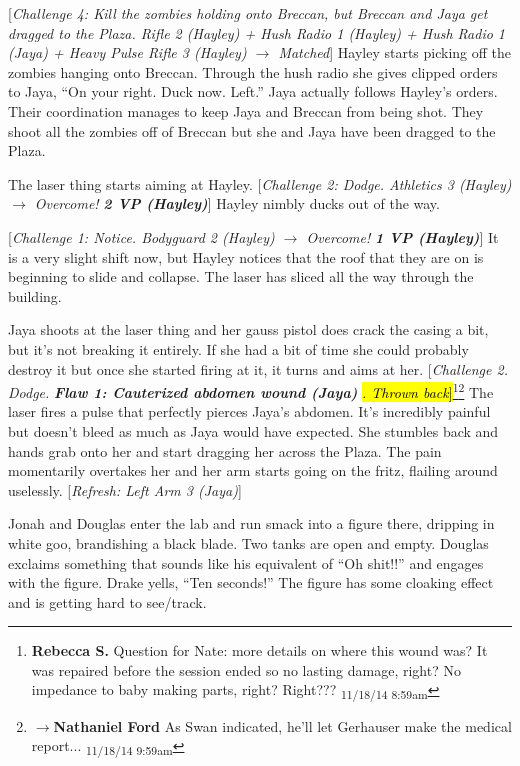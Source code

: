 {[}\textit{Challenge 4: Kill the zombies holding onto Breccan, but Breccan and Jaya get dragged to the Plaza.  Rifle 2 (Hayley) + Hush Radio 1 (Hayley) + Hush Radio 1 (Jaya) + Heavy Pulse Rifle 3 (Hayley) $\rightarrow$ Matched}{]}  Hayley starts picking off the zombies hanging onto Breccan.  Through the hush radio she gives clipped orders to Jaya, ``On your right.  Duck now.  Left.''  Jaya actually follows Hayley's orders.  Their coordination manages to keep Jaya and Breccan from being shot.  They shoot all the zombies off of Breccan but she and Jaya have been dragged to the Plaza.



The laser thing starts aiming at Hayley.  {[}\textit{Challenge 2: Dodge.  Athletics 3 (Hayley) $\rightarrow$  Overcome! }\textit{\textbf{2 VP (Hayley)}}{]}  Hayley nimbly ducks out of the way.  

{[}\textit{Challenge 1: Notice.  Bodyguard 2 (Hayley) $\rightarrow$  Overcome! }\textit{\textbf{1 VP (Hayley)}}{]}  It is a very slight shift now, but Hayley notices that the roof that they are on is beginning to slide and collapse.  The laser has sliced all the way through the building.



Jaya shoots at the laser thing and her gauss pistol does crack the casing a bit, but it's not breaking it entirely.  If she had a bit of time she could probably destroy it but once she started firing at it, it turns and aims at her. {[}\textit{Challenge 2. Dodge.   }\textit{\textbf{ {\color[RGB]{255,0,0}Flaw 1: Cauterized abdomen wound (Jaya)} }}\hl{\textit{.  Thrown back}{]}}\footnote{\textbf{Rebecca S. }Question for Nate: more details on where this wound was? It was repaired before the session ended so no lasting damage, right?  No impedance to baby making parts, right? Right??? \textsubscript{11/18/14 8:59am}}\footnote{$\rightarrow$\textbf{Nathaniel Ford }As Swan indicated, he'll let Gerhauser make the medical report... \textsubscript{11/18/14 9:59am}}  The laser fires a pulse that perfectly pierces Jaya's abdomen.  It's incredibly painful but doesn't bleed as much as Jaya would have expected.  She stumbles back and hands grab onto her and start dragging her across the Plaza.  The pain momentarily overtakes her and her arm starts going on the fritz, flailing around uselessly. {[}\textit{Refresh: Left Arm 3 (Jaya)}{]}





Jonah and Douglas enter the lab and run smack into a figure there, dripping in white goo, brandishing a black blade.  Two tanks are open and empty.  Douglas exclaims something that sounds like his equivalent of ``Oh shit!!'' and engages with the figure.  Drake yells, ``Ten seconds!''  The figure has some cloaking effect and is getting hard to see/track.



